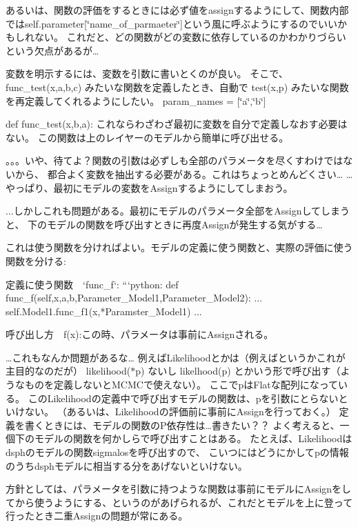 あるいは、関数の評価をするときには必ず値をassignするようにして、関数内部ではself.\+parameter\mbox{[}\char`\"{}name\+\_\+of\+\_\+parmaeter\char`\"{}\mbox{]}という風に呼ぶようにするのでいいかもしれない。 これだと、どの関数がどの変数に依存しているのかわかりづらいという欠点があるが…

変数を明示するには、変数を引数に書いとくのが良い。 そこで、 func\+\_\+test(x,a,b,c) みたいな関数を定義したとき、自動で test(x,p) みたいな関数を再定義してくれるようにしたい。 param\+\_\+names = \mbox{[}\char`\"{}a\char`\"{},\char`\"{}b\char`\"{}\mbox{]}

def func\+\_\+test(x,b,a)\+: これならわざわざ最初に変数を自分で定義しなおす必要はない。 この関数は上のレイヤーのモデルから簡単に呼び出せる。

。。。いや、待てよ？関数の引数は必ずしも全部のパラメータを尽くすわけではないから、 都合よく変数を抽出する必要がある。これはちょっとめんどくさい… …やっぱり、最初にモデルの変数を\+Assignするようにしてしまおう。

...しかしこれも問題がある。最初にモデルのパラメータ全部を\+Assignしてしまうと、 下のモデルの関数を呼び出すときに再度\+Assignが発生する気がする…

これは使う関数を分ければよい。モデルの定義に使う関数と、実際の評価に使う関数を分ける\+: \begin{DoxyVerb}定義に使う関数　`func_f`:
    ```python:
    def func_f(self,x,a,b,Parameter_Model1,Parameter_Model2):
        ...
        self.Model1.func_f1(x,*Paramster_Model1)
    ...

呼び出し方　f(x):この時、パラメータは事前にAssignされる。
\end{DoxyVerb}


…これもなんか問題があるな… 例えば\+Likelihoodとかは（例えばというかこれが主目的なのだが） likelihood($\ast$p) ないし likelhood(p) とかいう形で呼び出す（ようなものを定義しないと\+M\+C\+M\+Cで使えない）。 ここでpは\+Flatな配列になっている。 この\+Likelihoodの定義中で呼び出すモデルの関数は、pを引数にとらないといけない。 （あるいは、\+Likelihoodの評価前に事前に\+Assignを行っておく。） 定義を書くときには、モデルの関数の\+P依存性は…書きたい？？ よく考えると、一個下のモデルの関数を何かしらで呼び出すことはある。 たとえば、\+Likelihoodはdsphのモデルの関数sigmalosを呼び出すので、 こいつにはどうにかしてpの情報のうちdsphモデルに相当する分をあげないといけない。

方針としては、パラメータを引数に持つような関数は事前にモデルに\+Assignをしてから使うようにする、というのがあげられるが、これだとモデルを上に登って行ったとき二重\+Assignの問題が常にある。

